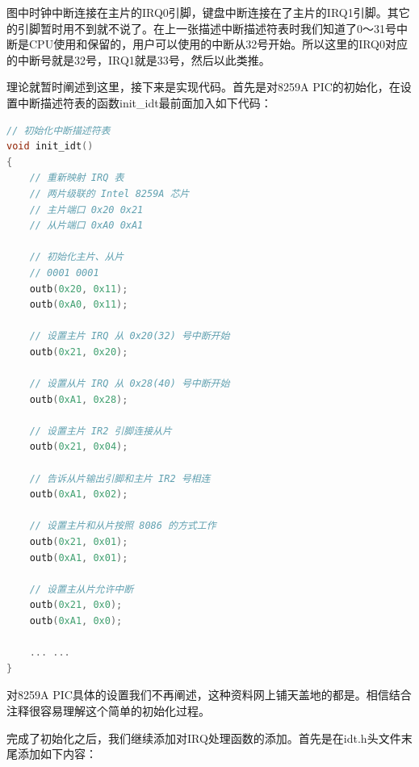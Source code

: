 \par 图中时钟中断连接在主片的IRQ0引脚，键盘中断连接在了主片的IRQ1引脚。其它的引脚暂时用不到就不说了。在上一张描述中断描述符表时我们知道了0～31号中断是CPU使用和保留的，用户可以使用的中断从32号开始。所以这里的IRQ0对应的中断号就是32号，IRQ1就是33号，然后以此类推。

\par 理论就暂时阐述到这里，接下来是实现代码。首先是对8259A PIC的初始化，在设置中断描述符表的函数init\_idt最前面加入如下代码：

\begin{lstlisting}[language = C, caption = idt/idt.c]
// 初始化中断描述符表
void init_idt()
{	
	// 重新映射 IRQ 表
	// 两片级联的 Intel 8259A 芯片
	// 主片端口 0x20 0x21
	// 从片端口 0xA0 0xA1
	
	// 初始化主片、从片
	// 0001 0001
	outb(0x20, 0x11);
	outb(0xA0, 0x11);

	// 设置主片 IRQ 从 0x20(32) 号中断开始
	outb(0x21, 0x20);

	// 设置从片 IRQ 从 0x28(40) 号中断开始
	outb(0xA1, 0x28);
	
	// 设置主片 IR2 引脚连接从片
	outb(0x21, 0x04);

	// 告诉从片输出引脚和主片 IR2 号相连
	outb(0xA1, 0x02);
	
	// 设置主片和从片按照 8086 的方式工作
	outb(0x21, 0x01);
	outb(0xA1, 0x01);
	
	// 设置主从片允许中断
	outb(0x21, 0x0);
	outb(0xA1, 0x0);
	
	... ...
}
\end{lstlisting}

\par 对8259A PIC具体的设置我们不再阐述，这种资料网上铺天盖地的都是。相信结合注释很容易理解这个简单的初始化过程。

\par 完成了初始化之后，我们继续添加对IRQ处理函数的添加。首先是在idt.h头文件末尾添加如下内容：

